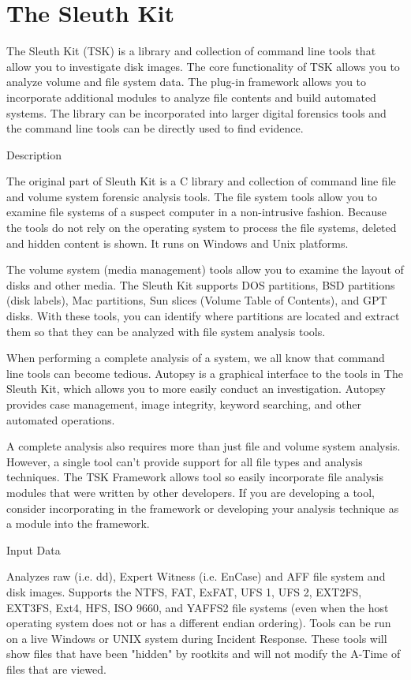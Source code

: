 \section{The Sleuth Kit}

The Sleuth Kit (TSK) is a library and collection of command line tools that allow
you to investigate disk images. The core functionality of TSK allows you to analyze
volume and file system data. The plug-in framework allows you to incorporate
additional modules to analyze file contents and build automated systems. The
library can be incorporated into larger digital forensics tools and the command
line tools can be directly used to find evidence.

Description

The original part of Sleuth Kit is a C library and collection of command line
file and volume system forensic analysis tools. The file system tools allow you
to examine file systems of a suspect computer in a non-intrusive fashion. Because
the tools do not rely on the operating system to process the file systems, deleted
and hidden content is shown. It runs on Windows and Unix platforms.

The volume system (media management) tools allow you to examine the layout of disks
and other media. The Sleuth Kit supports DOS partitions, BSD partitions 
(disk labels), Mac partitions, Sun slices (Volume Table of Contents), and 
GPT disks. With these tools, you can identify where partitions are located 
and extract them so that they can be analyzed with file system analysis tools.

When performing a complete analysis of a system, we all know that command line 
tools can become tedious. Autopsy is a graphical interface to the tools in The 
Sleuth Kit, which allows you to more easily conduct an investigation. Autopsy 
provides case management, image integrity, keyword searching, and other automated
operations.

A complete analysis also requires more than just file and volume system analysis.
However, a single tool can't provide support for all file types and analysis 
techniques. The TSK Framework allows tool so easily incorporate file analysis
modules that were written by other developers. If you are developing a tool,
consider incorporating in the framework or developing your analysis technique
as a module into the framework.

Input Data

Analyzes raw (i.e. dd), Expert Witness (i.e. EnCase) and AFF file system and disk
images.
Supports the NTFS, FAT, ExFAT, UFS 1, UFS 2, EXT2FS, EXT3FS, Ext4, HFS, ISO 9660,
and YAFFS2 file systems (even when the host operating system does not or has a
different endian ordering).
Tools can be run on a live Windows or UNIX system during Incident Response. 
These tools will show files that have been "hidden" by rootkits and will not 
modify the A-Time of files that are viewed.

